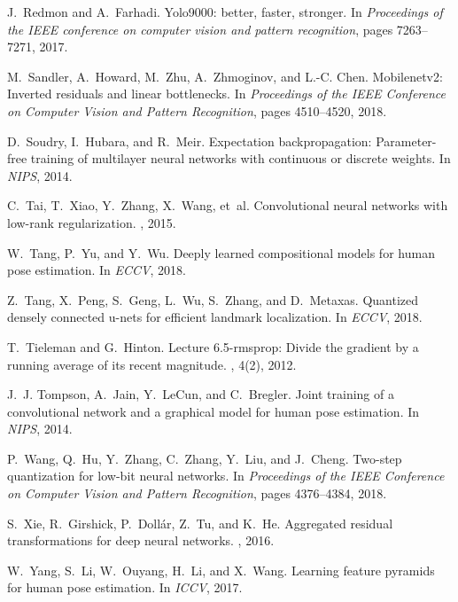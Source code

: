 \documentclass[10pt,twocolumn,letterpaper]{article}
\begin{document}
{\begin{thebibliography}{10}
J.~Redmon and A.~Farhadi.
\newblock Yolo9000: better, faster, stronger.
\newblock In {\em Proceedings of the IEEE conference on computer vision and
  pattern recognition}, pages 7263--7271, 2017.

M.~Sandler, A.~Howard, M.~Zhu, A.~Zhmoginov, and L.-C. Chen.
\newblock Mobilenetv2: Inverted residuals and linear bottlenecks.
\newblock In {\em Proceedings of the IEEE Conference on Computer Vision and
  Pattern Recognition}, pages 4510--4520, 2018.

D.~Soudry, I.~Hubara, and R.~Meir.
\newblock Expectation backpropagation: Parameter-free training of multilayer
  neural networks with continuous or discrete weights.
\newblock In {\em NIPS}, 2014.

C.~Tai, T.~Xiao, Y.~Zhang, X.~Wang, et~al.
\newblock Convolutional neural networks with low-rank regularization.
, 2015.

W.~Tang, P.~Yu, and Y.~Wu.
\newblock Deeply learned compositional models for human pose estimation.
\newblock In {\em ECCV}, 2018.

Z.~Tang, X.~Peng, S.~Geng, L.~Wu, S.~Zhang, and D.~Metaxas.
\newblock Quantized densely connected u-nets for efficient landmark
  localization.
\newblock In {\em ECCV}, 2018.

T.~Tieleman and G.~Hinton.
\newblock Lecture 6.5-rmsprop: Divide the gradient by a running average of its
  recent magnitude.
, 4(2), 2012.

J.~J. Tompson, A.~Jain, Y.~LeCun, and C.~Bregler.
\newblock Joint training of a convolutional network and a graphical model for
  human pose estimation.
\newblock In {\em NIPS}, 2014.

P.~Wang, Q.~Hu, Y.~Zhang, C.~Zhang, Y.~Liu, and J.~Cheng.
\newblock Two-step quantization for low-bit neural networks.
\newblock In {\em Proceedings of the IEEE Conference on Computer Vision and
  Pattern Recognition}, pages 4376--4384, 2018.

S.~Xie, R.~Girshick, P.~Doll{\'a}r, Z.~Tu, and K.~He.
\newblock Aggregated residual transformations for deep neural networks.
, 2016.

W.~Yang, S.~Li, W.~Ouyang, H.~Li, and X.~Wang.
\newblock Learning feature pyramids for human pose estimation.
\newblock In {\em ICCV}, 2017.


\end{thebibliography}}
\end{document}
